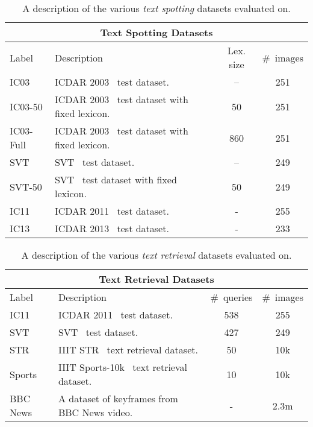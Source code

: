 \documentclass[twocolumn]{svjour3}          \smartqed  \usepackage{epsfig}
\begin{document}
\begin{table*}[t]
\begin{center}\footnotesize
\begin{tabular}{|l|l|c|c|} \hline
\multicolumn{4}{|c|}{\bf Text Spotting Datasets}\\
\hline
Label & {\centering\footnotesize Description} & Lex. size & \#~images\\
\hline\hline
IC03        & {ICDAR 2003~\cite{icdar2003dataset} test dataset.} & -- & 251\\
\hline
IC03-50     & {ICDAR 2003~\cite{icdar2003dataset} test dataset with fixed lexicon.} & 50 & 251\\
\hline
IC03-Full   & {ICDAR 2003~\cite{icdar2003dataset} test dataset with fixed lexicon.} & 860 & 251\\
\hline
SVT         & {SVT~\cite{Wang10} test dataset.} & -- & 249\\
\hline
SVT-50      & {SVT~\cite{Wang10} test dataset with fixed lexicon.} & 50 & 249\\
\hline
IC11      & {ICDAR 2011~\cite{ICDAR11} test dataset.} & - & 255\\
\hline
IC13      & {ICDAR 2013~\cite{ICDAR2013} test dataset.} & - & 233\\
\hline
\end{tabular}
\end{center}\vspace{-1em}
\caption{\small A description of the various \emph{text spotting} datasets evaluated on.}
\label{table:evalspotting}
\end{table*}

\begin{table*}[t]
\begin{center}\footnotesize
\begin{tabular}{|l|l|c|c|} \hline
\multicolumn{4}{|c|}{\bf Text Retrieval Datasets}\\
\hline
Label & {\centering\footnotesize Description} & \#~queries & \#~images\\
\hline\hline
IC11        & {ICDAR 2011~\cite{ICDAR11} test dataset.} & 538 & 255\\
\hline
SVT         & {SVT~\cite{Wang10} test dataset.} & 427 & 249\\
\hline
STR    & {IIIT STR~\cite{Mishra13} text retrieval dataset.} & 50 & 10k\\
\hline
Sports    & {IIIT Sports-10k~\cite{Mishra13} text retrieval dataset.} & 10 & 10k\\
\hline
BBC News    & {A dataset of keyframes from BBC News video.} & - & 2.3m\\
\hline
\end{tabular}
\end{center}\vspace{-1em}
\caption{\small A description of the various \emph{text retrieval} datasets evaluated on.}
\label{table:evalretrieval}
\end{table*}
\end{document}
